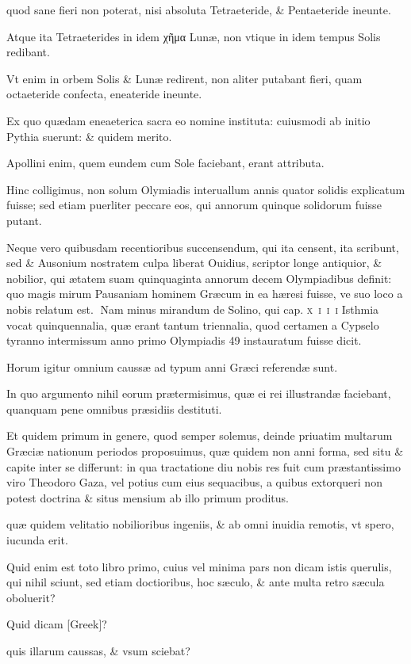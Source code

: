 \begin{parnumbers}
quod sane fieri non poterat, nisi absoluta Tetraeteride, \& Pentaeteride ineunte.

Atque ita Tetraeterides in idem \textgreek{χῆμα} Lunæ, non vtique in idem tempus Solis redibant.

Vt enim in orbem Solis \& Lunæ redirent, non aliter putabant fieri, quam octaeteride confecta, eneateride ineunte.

Ex quo quædam eneaeterica sacra eo nomine instituta: cuiusmodi ab initio Pythia suerunt: \& quidem merito.

Apollini enim, quem eundem cum Sole faciebant, erant attributa.

Hinc colligimus, non solum Olymiadis interuallum annis quator solidis explicatum fuisse; sed etiam puerliter peccare eos, qui annorum quinque solidorum fuisse putant.

Neque vero quibusdam recentioribus succensendum, qui ita censent, ita scribunt, sed \& Ausonium nostratem culpa liberat Ouidius, scriptor longe antiquior, \& nobilior, qui ætatem suam quinquaginta annorum decem Olympiadibus definit: quo magis mirum Pausaniam hominem Græcum in ea hæresi fuisse, ve suo loco a nobis relatum
est.
Nam minus mirandum de Solino, qui cap. \textsc{x~i~i~i} Isthmia vocat quinquennalia, quæ erant tantum triennalia, quod certamen a Cypselo tyranno intermissum anno primo Olympiadis 49 instauratum fuisse dicit.

Horum igitur omnium caussæ ad typum anni Græci referendæ sunt.

In quo argumento nihil eorum prætermisimus, quæ ei rei illustrandæ faciebant, quanquam pene omnibus præsidiis destituti.

Et quidem primum in genere, quod semper solemus, deinde priuatim multarum Græciæ nationum periodos proposuimus, quæ quidem non anni forma, sed situ \& capite inter se differunt: in qua tractatione diu nobis res fuit cum præstantissimo viro Theodoro Gaza, vel potius cum eius sequacibus, a quibus extorqueri non potest doctrina \& situs mensium ab illo primum 
proditus. 

quæ quidem velitatio nobilioribus ingeniis, \& ab omni inuidia remotis, vt spero, iucunda erit.

Quid enim est toto libro primo, cuius vel minima pars non dicam istis querulis, qui nihil sciunt, sed etiam doctioribus, hoc sæculo, \& ante multa retro sæcula oboluerit?

Quid dicam \textgreek{[Greek]}?

quis illarum caussas, \& vsum sciebat?


\end{parnumbers}
